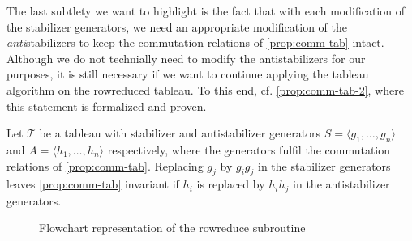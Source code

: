 The last subtlety we want to highlight is the fact that with each modification
of the stabilizer generators, we need an appropriate modification of the
\emph{anti}stabilizers to keep the commutation relations of
\cref{prop:comm-tab} intact. Although we do not technially need to modify the
antistabilizers for our purposes, it is still necessary if we want to continue
applying the tableau algorithm on the rowreduced tableau. To this end, cf.
\cref{prop:comm-tab-2}, where this statement is formalized and proven.
\begin{prop}\label{prop:comm-tab-2}
  Let $\mathcal{T}$ be a tableau with stabilizer and antistabilizer generators
  $S=\langle g_1, \ldots, g_n \rangle$ and $A=\langle h_1, \ldots, h_n \rangle$
  respectively, where the generators fulfil the commutation relations of
  \cref{prop:comm-tab}. 
  Replacing $g_j$ by $g_i g_j$ in the stabilizer generators leaves
  \cref{prop:comm-tab} invariant if $h_i$ is replaced by $h_i h_j$ in the antistabilizer
  generators.
\end{prop}
\begin{figure}[H]
  \centering
  
  \caption{Flowchart representation of the rowreduce subroutine}
  \label{fig:rowreduce-diag}
\end{figure}
